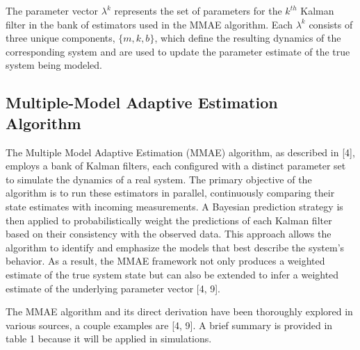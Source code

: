 \documentclass[letterpaper, 10 pt, conference]{ieeeconf}  %
\begin{document}
The parameter vector $\lambda^k$ represents the set of parameters for the $k^{th}$ Kalman filter in the bank of estimators used in the MMAE algorithm. Each $\lambda^k$ consists of three unique components, $\{m, k, b\}$, which define the resulting dynamics of the corresponding system and are used to update the parameter estimate of the true system being modeled.

\subsection{Multiple-Model Adaptive Estimation Algorithm}
The Multiple Model Adaptive Estimation (MMAE) algorithm, as described in [4], employs a bank of Kalman filters, each configured with a distinct parameter set to simulate the dynamics of a real system. The primary objective of the algorithm is to run these estimators in parallel, continuously comparing their state estimates with incoming measurements. A Bayesian prediction strategy is then applied to probabilistically weight the predictions of each Kalman filter based on their consistency with the observed data. This approach allows the algorithm to identify and emphasize the models that best describe the system's behavior. As a result, the MMAE framework not only produces a weighted estimate of the true system state but can also be extended to infer a weighted estimate of the underlying parameter vector [4, 9].

The MMAE algorithm and its direct derivation have been thoroughly explored in various sources, a couple examples are [4, 9]. A brief summary is provided in table 1 because it will be applied in simulations.
\end{document}
